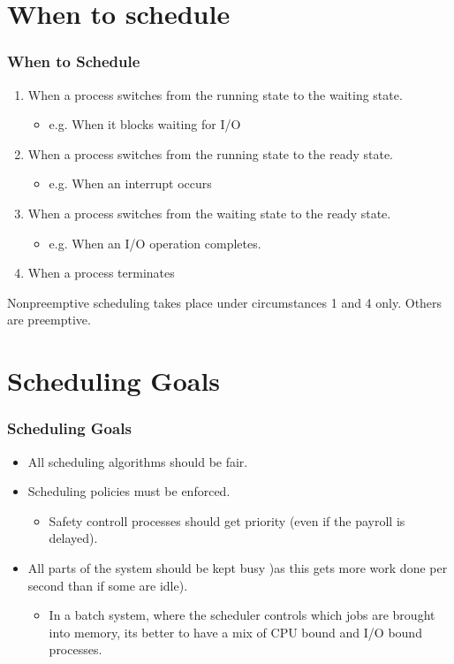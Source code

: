 \documentclass{beamer}
\begin{document}
\section{When to schedule}
\begin{frame}
\frametitle{When to Schedule}
\begin{enumerate}
\item When a process switches from the running state to the waiting state.
\begin{itemize}
\item e.g. When it blocks waiting for I/O
\end{itemize}
\item When a process switches from the running state to the ready state.
\begin{itemize}
\item e.g. When an interrupt occurs
\end{itemize}
\item When a process switches from the waiting state to the ready state.
\begin{itemize}
\item e.g. When an I/O operation completes.
\end{itemize}
\item When a process terminates
\end{enumerate}
Nonpreemptive scheduling takes place under circumstances 1 and 4 only. Others are preemptive.
\end{frame}
\section{Scheduling Goals}
\begin{frame}
\frametitle{Scheduling Goals}
\begin{itemize}
\item All scheduling algorithms should be fair.
\item Scheduling policies must be enforced.
\begin{itemize}
\item Safety controll processes should get priority (even if the payroll is delayed).
\end{itemize}
\item All parts of the system should be kept busy )as this gets more work done per second than if some are idle).
\begin{itemize}
\item In a batch system, where the scheduler controls which jobs are brought into memory, its better to have a mix of CPU bound and I/O bound processes.
\end{itemize}
\end{itemize}
\end{frame}
\end{document}
